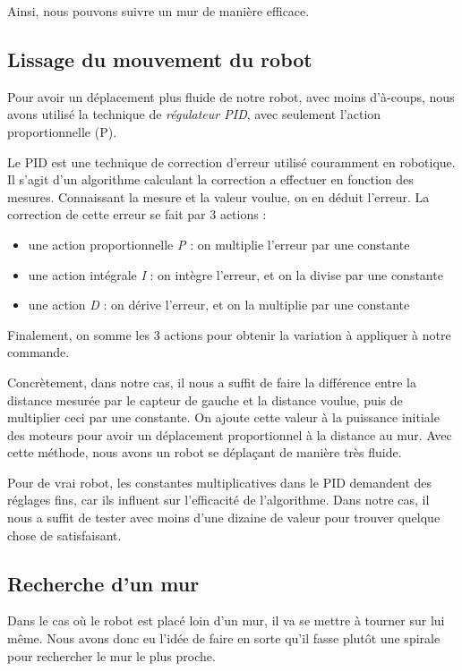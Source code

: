 \documentclass{scrartcl}
\begin{document}
Ainsi, nous pouvons suivre un mur de manière efficace.

\subsection{Lissage du mouvement du robot}

Pour avoir un déplacement plus fluide de notre robot, avec moins
d'à-coups, nous avons utilisé la technique de \emph{régulateur PID},
avec seulement l'action proportionnelle (P).

Le PID est une technique de correction d'erreur utilisé couramment en
robotique. Il s'agit d'un algorithme calculant la correction a effectuer
en fonction des mesures. Connaissant la mesure et la valeur voulue,
on en déduit l'erreur. La correction de cette erreur se fait par 3
actions :

\begin{itemize}
    \item une action proportionnelle \textit{P} : on multiplie l'erreur par une constante
    \item une action intégrale \textit{I} : on intègre l'erreur, et on la divise par une constante
    \item une action \textit{D} : on dérive l'erreur, et on la multiplie par une constante
\end{itemize}

Finalement, on somme les 3 actions pour obtenir la variation à appliquer à notre
commande.

Concrètement, dans notre cas, il nous a suffit de faire la différence entre
la distance mesurée par le capteur de gauche et la distance voulue, puis
de multiplier ceci par une constante. On ajoute cette valeur à la puissance initiale
des moteurs pour avoir un déplacement proportionnel à la distance au mur.
Avec cette méthode, nous avons un robot se déplaçant de manière très fluide.

Pour de vrai robot, les constantes multiplicatives dans le PID demandent des réglages
fins, car ils influent sur l'efficacité de l'algorithme. Dans notre cas, il nous
a suffit de tester avec moins d'une dizaine de valeur pour trouver quelque chose
de satisfaisant.

\subsection{Recherche d'un mur}

Dans le cas où le robot est placé loin d'un mur, il va se mettre à tourner sur lui même.
Nous avons donc eu l'idée de faire en sorte qu'il fasse plutôt une spirale pour
rechercher le mur le plus proche.
\end{document}
